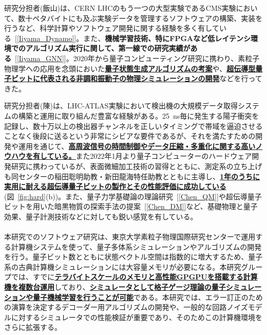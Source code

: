 \documentclass[11pt,a4j,dvipdfmx]{jarticle} 					%
\newcommand{\研究課題名}{誤り耐性量子コンピュータに向けた誤り訂正技術の開発(仮)}
\newcommand{\研究機関名}{東京大学}
\newcommand{\研究代表者氏名}{寺師弘二}
\newcommand{\研究期間の最終元号年度}{10}  %
\newcommand{\mybf}[1]{{\bfseries\sffamily#1}}
\begin{document}
研究分担者(飯山)は、CERN LHCのもう一つの大型実験であるCMS実験において、数十ペタバイトにも及ぶ実験データを管理するソフトウェアの構築、実装を行うなど、科学計算やソフトウェア開発に関する経験を多く有している~[\ref{Iiyama_Dynamo}]。また、\mybf{機械学習技術、特にFPGAなど低レイテンシ環境でのアルゴリズム実行に関して、第一線での研究実績がある}~[\ref{Iiyama_GNN}]。2020年から量子コンピューティング研究に携わり、素粒子物理学への応用を念頭においた\mybf{\ul{量子状態生成アルゴリズムの考案}}や、\mybf{\ul{超伝導型量子ビットに代表される非調和振動子の物理シミュレーションの開発}}などを行ってきた。

研究分担者(陳)は、LHC-ATLAS実験において検出機の大規模データ取得システムの構築と運用に取り組んだ豊富な経験がある。25~ns毎に発生する陽子衝突を記録し、数十万以上の検出器チャンネルを正しいタイミングで帯域を逼迫させることなく後段に送るという非常にシビアな要件であるが、それを満たすための開発や運用を通じて、\mybf{\ul{高周波信号の時間制御やデータ圧縮・多重化に関する高いノウハウを有している。}}また2022年1月より量子コンピューターのハードウェア開発研究に携わっているが、表面微細加工技術の習得とともに、測定系の立ち上げも同センターの稲田聡明助教・新田龍海特任助教とともに主導し、\mybf{\ul{1年のうちに実用に耐える超伝導量子ビットの製作とその性能評価に成功している}} (図~\ref{fig:hard}(b))。また、量子力学基礎論の理論研究~[\ref{Chen_QM}]や超伝導量子ビットを用いた暗黒物質の探索手法の提案~[\ref{Chen_DM}]など、基礎物理と量子効果、量子計測技術などに対しても鋭い感覚を有している。\vspace{-2mm}\\


\\
本研究でのソフトウェア研究は、東京大学素粒子物理国際研究センターで運用する計算機システムを使って、量子多体系シミュレーションやアルゴリズムの開発を行う。量子ビット数とともに状態ベクトル空間は指数的に増大するため、量子系の古典計算機シミュレーションには大容量メモリが必要になる。本研究グループでは、すでに\mybf{\ul{テラバイトスケールのメモリと高性能GPGPUを搭載する計算機を複数台運用}}しており、\mybf{\ul{シミュレータとして格子ゲージ理論の量子シミュレーションや量子機械学習を行うことが可能}}である。本研究では、エラー訂正のための演算を決定するデコーダー用アルゴリズムの開発や、一般的な回路ノイズモデルに対するシミュレータでの性能検証が重要であり、そのためこの計算機環境をさらに拡張する。
\end{document}
